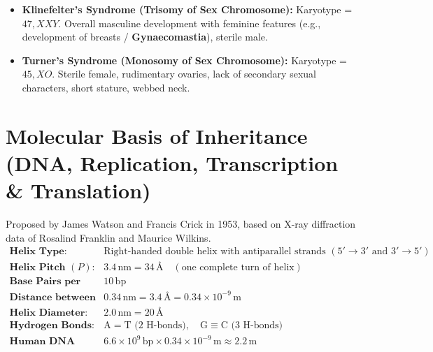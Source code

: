 \documentclass[10pt,a4paper]{article}
\begin{document}
\begin{trapbox}
\begin{itemize}
  \item \textbf{Klinefelter's Syndrome (Trisomy of Sex Chromosome):} Karyotype = $47, XXY$. Overall masculine development with feminine features (e.g., development of breasts / \textbf{Gynaecomastia}), sterile male.
  \item \textbf{Turner's Syndrome (Monosomy of Sex Chromosome):} Karyotype = $45, XO$. Sterile female, rudimentary ovaries, lack of secondary sexual characters, short stature, webbed neck.
\end{itemize}
\end{trapbox}

\section{Molecular Basis of Inheritance (DNA, Replication, Transcription \& Translation)}

\begin{formulabox}
Proposed by James Watson and Francis Crick in 1953, based on X-ray diffraction data of Rosalind Franklin and Maurice Wilkins.
\begin{align*}
  \textbf{Helix Type: } & \text{Right-handed double helix with antiparallel strands } (5'\to 3' \text{ and } 3'\to 5')\\
  \textbf{Helix Pitch } (P): & 3.4\,\mathrm{nm} = 34\,\text{\AA} \quad (\text{one complete turn of helix})\\
  \textbf{Base Pairs per Turn: } & 10\,\mathrm{bp}\\
  \textbf{Distance between bp: } & 0.34\,\mathrm{nm} = 3.4\,\text{\AA} = 0.34 \times 10^{-9}\,\mathrm{m}\\
  \textbf{Helix Diameter: } & 2.0\,\mathrm{nm} = 20\,\text{\AA}\\
  \textbf{Hydrogen Bonds: } & \mathrm{A=T} \text{ (2 H-bonds)}, \quad \mathrm{G\equiv C} \text{ (3 H-bonds)}\\
  \textbf{Human DNA Length: } & 6.6 \times 10^9\,\mathrm{bp} \times 0.34 \times 10^{-9}\,\mathrm{m} \approx \mathbf{2.2\,\mathrm{m}}
\end{align*}
\end{formulabox}
\end{document}
